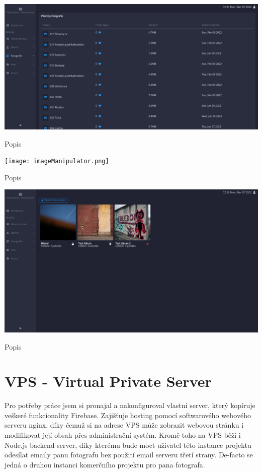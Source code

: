 \documentclass[12pt,a4paper]{report}
\begin{document}
  \vspace*{0.5cm}
  \noindent\includegraphics[width=\linewidth]{allPhotos.png}
  \begin{center}
    Popis
  \end{center}
  \vspace*{0.5cm}

  \vspace*{0.5cm}
  \noindent\texttt{[image: imageManipulator.png]}
  \begin{center}
    Popis
  \end{center}
  \vspace*{0.5cm}

  \vspace*{0.5cm}
  \noindent\includegraphics[width=\linewidth]{albums.png}
  \begin{center}
    Popis
  \end{center}
  \vspace*{0.5cm}
 
  \chapter{VPS - Virtual Private Server}
   Pro potřeby práce jsem si pronajal a nakonfiguroval vlastní server, který kopíruje veškeré funkcionality
   Firebase. Zajišťuje hosting pomocí softwarového webového serveru nginx, díky čemuž si na adrese VPS může
   zobrazit webovou stránku i modifikovat její obsah přes administrační systém. Kromě toho na VPS běží i Node.js backend server,
   díky kterému bude moct uživatel této instance projektu odesílat emaily panu fotografu bez použití email serveru třetí strany. 
   De-facto se jedná o druhou instanci komerčního projektu pro pana fotografa. 
\end{document}
